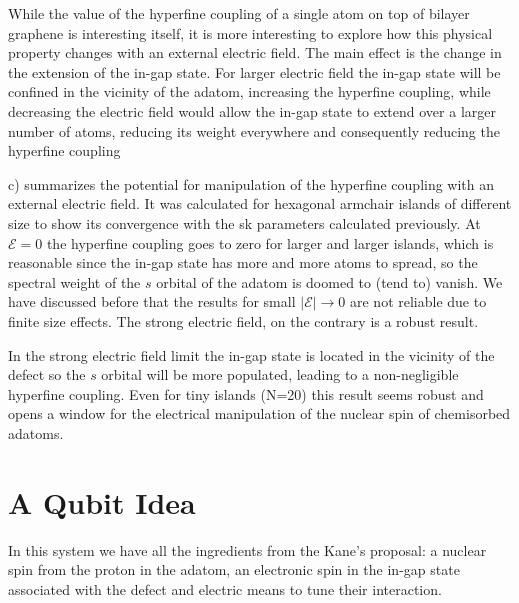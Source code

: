 While the value of the hyperfine coupling of a single  atom on top of bilayer graphene is interesting itself, it is more interesting to explore how this physical property changes with an external electric field.
The main effect is the change in the extension of the in-gap state. For larger electric field the in-gap state will be confined in the vicinity of the adatom, increasing the hyperfine coupling, while decreasing the electric field would allow the in-gap state to extend over a larger number of atoms, reducing its weight everywhere and consequently reducing the hyperfine coupling


c) summarizes the potential for manipulation of the hyperfine coupling with an external electric field. It was calculated for hexagonal armchair islands of different size to show its convergence with the \ac{sk} parameters calculated previously.
At $\mathcal{E}=0$ the hyperfine coupling goes to zero for larger and larger islands, which is reasonable since the in-gap state has more and more atoms to spread, so the spectral weight of the $s$ orbital of the adatom is doomed to (tend to) vanish. We have discussed before that the results for small $|\mathcal{E}|\to0$ are not reliable due to finite size effects. The strong electric field, on the contrary is a robust result.

In the strong electric field limit the in-gap state is located in the vicinity of the defect so the $s$ orbital will be more populated, leading to a non-negligible hyperfine coupling. Even for tiny islands (N=20) this result seems robust and opens a window for the electrical manipulation of the nuclear spin of chemisorbed  adatoms.




\section{A Qubit Idea}

In this system we have all the ingredients from the Kane's proposal: a nuclear spin from the proton in the  adatom, an electronic spin in the in-gap state associated with the defect and electric means to tune their interaction.

